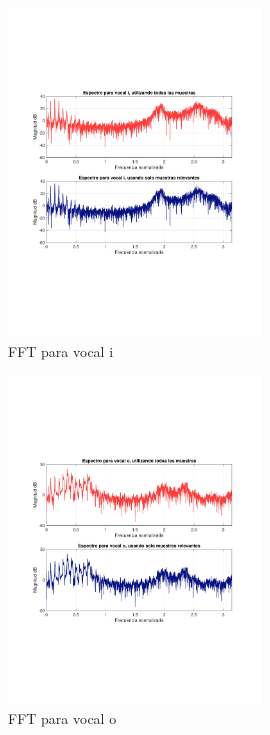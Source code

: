 	
	\begin{figure}[H]
		\center
		\includegraphics[width=0.6\textwidth,clip, trim = {1.9cm 6.8cm 2.3cm 7cm}]{../plots/i_fft.pdf}
		\caption{FFT para vocal i}
		\label{fig:i_fft}
	\end{figure}
	
	\begin{figure}[H]
		\center
		\includegraphics[width=0.6\textwidth,clip, trim = {1.9cm 6.8cm 2.3cm 7cm}]{../plots/o_fft.pdf}
		\caption{FFT para vocal o}
		\label{fig:o_fft}
	\end{figure}
	
